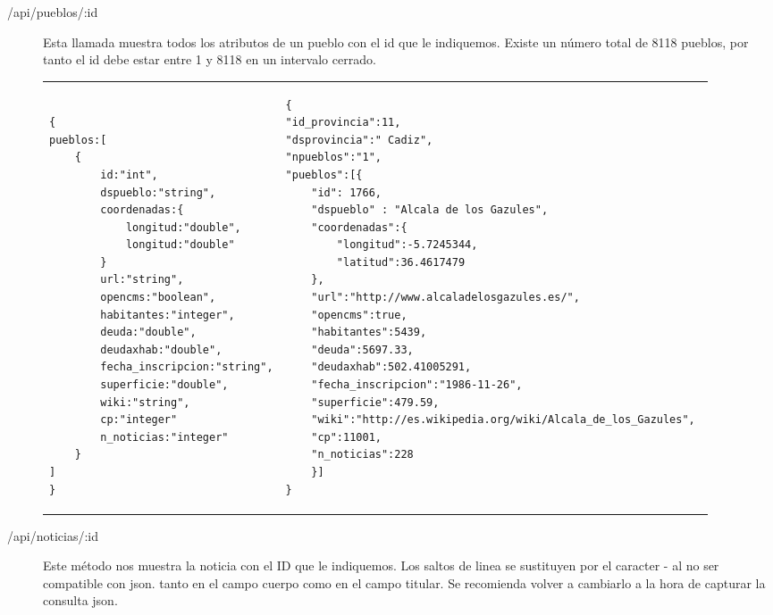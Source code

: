 \begin{description}

\item[/api/pueblos/:id]
Esta llamada muestra todos los atributos de un pueblo con el id que le indiquemos. Existe un número total de 8118 pueblos, por tanto el id debe estar entre 1 y 8118 en un intervalo cerrado.

\lstset{frame=none}

\begin{tabular}{p{6cm}p{6cm}}

\begin{minipage}{6cm}

\begin{lstlisting}

{
pueblos:[
	{
		id:"int",
		dspueblo:"string",	
		coordenadas:{
			longitud:"double",
			longitud:"double"
		}
		url:"string",
		opencms:"boolean",
		habitantes:"integer",
		deuda:"double",
		deudaxhab:"double",
		fecha_inscripcion:"string",
		superficie:"double",
		wiki:"string",
		cp:"integer"
		n_noticias:"integer"
	}
]
}

\end{lstlisting}

\end{minipage}

&

\begin{minipage}{6cm}

\begin{lstlisting}
{
"id_provincia":11,
"dsprovincia":" Cadiz",
"npueblos":"1",
"pueblos":[{
	"id": 1766,
	"dspueblo" : "Alcala de los Gazules",
	"coordenadas":{
		"longitud":-5.7245344,
		"latitud":36.4617479
	},
	"url":"http://www.alcaladelosgazules.es/",
	"opencms":true,
	"habitantes":5439,
	"deuda":5697.33,
	"deudaxhab":502.41005291,
	"fecha_inscripcion":"1986-11-26",
	"superficie":479.59, 
	"wiki":"http://es.wikipedia.org/wiki/Alcala_de_los_Gazules", 
	"cp":11001,
	"n_noticias":228
	}]
}

\end{lstlisting}

\end{minipage}

\\

\end{tabular}


\item[/api/noticias/:id]
Este método nos muestra la noticia con el ID que le indiquemos. Los saltos de linea se sustituyen por el caracter - al no ser compatible con json. tanto en el campo cuerpo como en el campo titular. Se recomienda volver a cambiarlo a la hora de capturar la consulta json.


\end{description}
